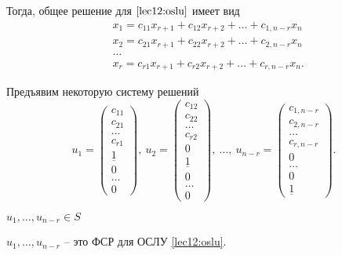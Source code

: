 Тогда, общее решение для $\eqref{lec12:oslu}$ имеет вид
\begin{align*}
    &x_1 = c_{11} x_{r + 1} + c_{12}x_{r + 2} + \dots + c_{1, n - r} x_n \\
    &x_2 = c_{21} x_{r + 1} + c_{22}x_{r + 2} + \dots + c_{2, n - r} x_n \\
    &\dots \\
    &x_r = c_{r1} x_{r + 1} + c_{r2}x_{r + 2} + \dots + c_{r, n - r} x_n
.\end{align*}

Предъявим некоторую систему решений
\begin{equation*}
    u_1 = \begin{pmatrix} 
        c_{11} \\
        c_{21} \\
        \dots \\
        c_{r1} \\
        \underline{1} \\
        0 \\
        \dots \\
        0
    \end{pmatrix}, \
    u_2 = \begin{pmatrix} 
        c_{12} \\
        c_{22} \\
        \dots \\
        c_{r2} \\
        0 \\
        \underline{1} \\
        0 \\
        \dots \\
        0
    \end{pmatrix}, \ \dots, \
    u_{n - r} = \begin{pmatrix} 
        c_{1, n - r} \\
        c_{2, n - r} \\
        \dots \\
        c_{r, n - r} \\
        0 \\
        \dots \\
        0 \\
        \underline{1}
    \end{pmatrix}
.\end{equation*}

$u_1, \dots, u_{n - r} \in S$

\begin{proposal}
    $u_1, \dots, u_{n - r}$ -- это ФСР для ОСЛУ \eqref{lec12:oslu}.
\end{proposal}

